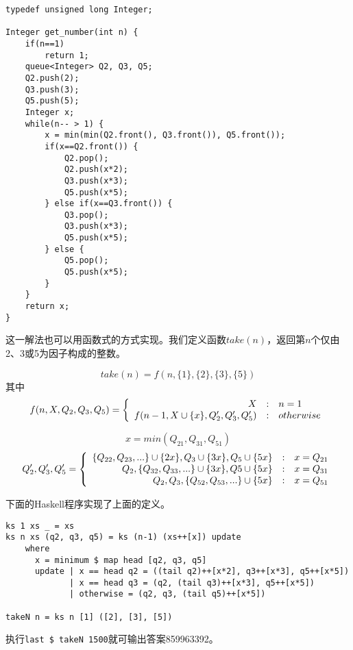 \documentclass{article}
\begin{document}
\lstset{language=C++}
\begin{lstlisting}
typedef unsigned long Integer;

Integer get_number(int n) {
    if(n==1)
        return 1;
    queue<Integer> Q2, Q3, Q5;
    Q2.push(2);
    Q3.push(3);
    Q5.push(5);
    Integer x;
    while(n-- > 1) {
        x = min(min(Q2.front(), Q3.front()), Q5.front());
        if(x==Q2.front()) {
            Q2.pop();
            Q2.push(x*2);
            Q3.push(x*3);
            Q5.push(x*5);
        } else if(x==Q3.front()) {
            Q3.pop();
            Q3.push(x*3);
            Q5.push(x*5);
        } else {
            Q5.pop();
            Q5.push(x*5);
        }
    }
    return x;
}
\end{lstlisting}

这一解法也可以用函数式的方式实现。我们定义函数$take(n)$，返回第$n$个仅由2、3或5为因子构成的整数。

\[
  take(n) = f(n, \{1\}, \{2\}, \{3\}, \{5\})
\]
其中
\[
 f(n, X, Q_2, Q_3, Q_5) = \left \{
  \begin{array}{r@{\quad:\quad}l}
  X & n = 1 \\
  f(n-1, X \cup \{x\}, Q_2', Q_3', Q_5') & otherwise
  \end{array}
\right.
\]

\[
 x = min(Q_{21}, Q_{31}, Q_{51})
\]
\[
 Q_2', Q_3', Q_5' = \left \{
 \begin{array}{r@{\quad:\quad}l}
 \{Q_{22}, Q_{23}, ...\} \cup \{2x\}, Q_3 \cup \{3x\}, Q_5 \cup \{5x\} & x = Q_{21} \\
 Q_2, \{Q_{32}, Q_{33}, ...\} \cup \{3x\}, Q5 \cup \{5x\} & x = Q_{31} \\
 Q_2, Q_3, \{Q_{52}, Q_{53}, ...\} \cup \{5x\} & x = Q_{51}
 \end{array}
 \right.
\]

下面的Haskell程序实现了上面的定义。

\begin{lstlisting}[style=Haskell]
ks 1 xs _ = xs
ks n xs (q2, q3, q5) = ks (n-1) (xs++[x]) update
    where
      x = minimum $ map head [q2, q3, q5]
      update | x == head q2 = ((tail q2)++[x*2], q3++[x*3], q5++[x*5])
             | x == head q3 = (q2, (tail q3)++[x*3], q5++[x*5])
             | otherwise = (q2, q3, (tail q5)++[x*5])

takeN n = ks n [1] ([2], [3], [5])
\end{lstlisting} %

执行\texttt{last \$ takeN 1500}就可输出答案859963392。
\end{document}
